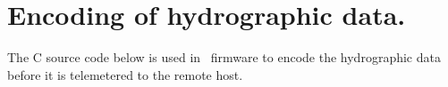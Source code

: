 %
%
%
%

\section{Encoding of hydrographic data.}
\label{sec:EncodeCSource}
\renewcommand{\theequation}{\Alph{section}.\arabic{equation}}

The C source code below is used in \apex\ firmware to encode the
hydrographic data before it is telemetered to the remote host.

